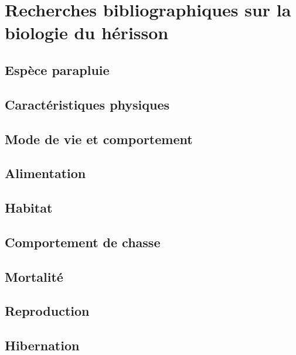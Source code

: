 \setcounter{secnumdepth}{2}

\chapter{Recherches bibliographiques sur la biologie du hérisson}

\section{Espèce parapluie}

\section{Caractéristiques physiques}

\section{Mode de vie et comportement}

\section{Alimentation}

\section{Habitat}

\section{Comportement de chasse}

\section{Mortalité}

\section{Reproduction}

\section{Hibernation}